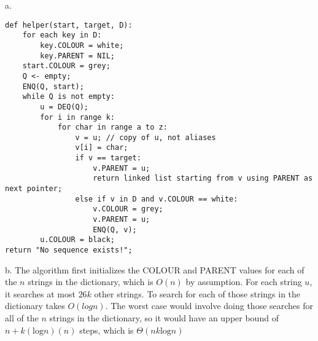 \documentclass[20pt]{article}
\begin{document}
\noindent
a. 
\begin{lstlisting}[mathescape=true]
def helper(start, target, D):
    for each key in D: 
        key.COLOUR = white; 
        key.PARENT = NIL; 
    start.COLOUR = grey;
    Q <- empty;
    ENQ(Q, start);
    while Q is not empty:
        u = DEQ(Q);
        for i in range k:
            for char in range a to z:
                v = u; // copy of u, not aliases
                v[i] = char;
                if v == target:
                    v.PARENT = u;
                    return linked list starting from v using PARENT as next pointer;
                else if v in D and v.COLOUR == white:
                    v.COLOUR = grey;
                    v.PARENT = u;
                    ENQ(Q, v);
        u.COLOUR = black;
return "No sequence exists!";

\end{lstlisting}
\begin{text}
b. The algorithm first initializes the COLOUR and PARENT values for each of the $n$ strings in the dictionary, which is $O(n)$ by assumption. For each string $u$, it searches at most $26k$ other strings. To search for each of those strings in the dictionary takes $O(log n)$. The worst case would involve doing those searches for all of the $n$ strings in the dictionary, so it would have an upper bound of $n + k(\text{log} n)(n)$ steps, which is $\Theta(nk\text{log} n )$

\end{text}
\end{document}
